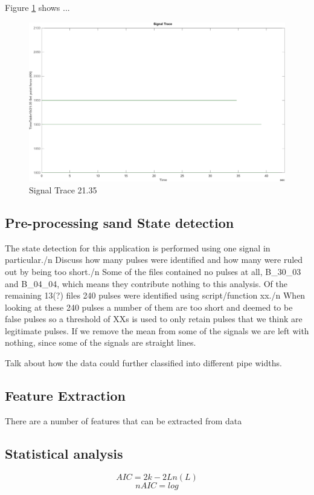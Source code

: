 \documentclass{article}
\begin{document}
Figure \ref{fig:SignalTrace21.35} shows ...
\begin{figure}[!ht]
    \centering
    \includegraphics[width=\textwidth, height=\textheight, keepaspectratio]{figures/SignalTrace21.35.png}
    \caption{Signal Trace 21.35}
    \label{fig:SignalTrace21.35}
\end{figure}
\subsection{Pre-processing sand State detection}
The state detection for this application is performed using one signal in particular./n
Discuss how many pulses were identified and how many were ruled out by being too short./n
Some of the files contained no pulses at all, B\_30\_03 and B\_04\_04, which means they contribute nothing to this analysis.
Of the remaining 13(?) files 240 pulses were identified using script/function xx./n
When looking at these 240 pulses a number of them are too short and deemed to be false pulses so a threshold of XXs is used to only retain pulses that we think are legitimate pulses.
If we remove the mean from some of the signals we are left with nothing, since some of the signals are straight lines.

Talk about how the data could further classified into different pipe widths.
\subsection{Feature Extraction}
There are a number of features that can be extracted from data 
\subsection{Statistical analysis}
$$ AIC = 2k - 2Ln(L) $$  
$$ nAIC = log $$
\end{document}
